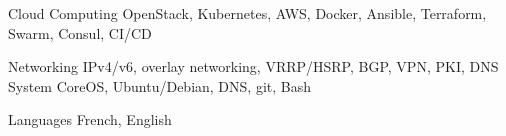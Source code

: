 

\begin{cvskills}

  \cvskill
    {Cloud Computing}
    {OpenStack, Kubernetes, AWS, Docker, Ansible, Terraform, Swarm, Consul, CI/CD}

  \cvskill
    {Networking}
    {IPv4/v6, overlay networking, VRRP/HSRP, BGP, VPN, PKI, DNS}
  \cvskill
    {System}
    {CoreOS, Ubuntu/Debian, DNS, git, Bash}


  \cvskill
    {Languages} %
    {French, English} %

\end{cvskills}
